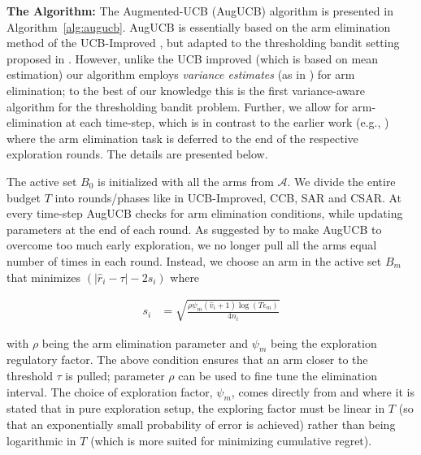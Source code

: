\label{notation}

\textbf{The Algorithm:} The Augmented-UCB (AugUCB) algorithm is presented in Algorithm~\ref{alg:augucb}.
AugUCB is essentially based on the arm elimination method of the UCB-Improved \cite{auer2010ucb}, but adapted to the thresholding bandit setting proposed in \cite{locatelli2016optimal}. However, unlike the UCB improved (which is based on mean estimation) our algorithm employs \emph{variance estimates} (as in \cite{audibert2009exploration}) for arm elimination; to the best of our knowledge this is the first variance-aware  algorithm for the thresholding bandit problem. Further, we allow for arm-elimination at each time-step, which is in contrast to the earlier work (e.g., \cite{auer2010ucb,chen2014combinatorial}) where the arm elimination task is deferred to the end of the respective exploration rounds. The details are presented below.

The active set $B_{0}$ is initialized with all the arms from $\mathcal{A}$. We divide the entire budget $T$ into rounds/phases like in UCB-Improved, CCB, SAR and CSAR. At every time-step AugUCB checks for arm elimination conditions, while updating parameters at the end of each round. As suggested by \cite{liu2016modification} to make AugUCB to overcome too much early exploration, we no longer pull all the arms equal number of times in each round. Instead, we choose an arm in the active set $B_m$ that minimizes $(|\hat{r}_{i} - \tau |-2s_i)$ where 
\begin{small}
\begin{align*}
s_i & = \sqrt{\frac{\rho\psi_m (\hat{v}_{i}+1) \log ( T \epsilon_{m})}{4 n_{i}}} %
\end{align*}
\end{small} 
with $\rho$ being the arm elimination parameter and $\psi_{m}$ being the exploration regulatory factor.
The above condition ensures that an arm closer to the threshold $\tau$ is pulled; 
parameter $\rho$ can be used to fine tune the elimination interval.
The choice of exploration factor, $\psi_m$,
comes directly from \cite{audibert2010best} and \cite{bubeck2011pure} where it is  stated that in pure exploration setup, the exploring factor must be linear in $T$ (so that an exponentially small probability of error is achieved) rather than being logarithmic in $T$ (which is more suited for minimizing cumulative regret).

